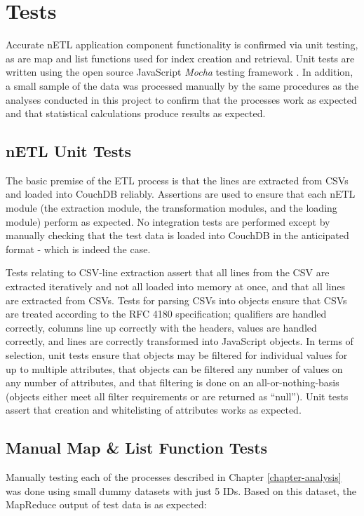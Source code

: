 \section{Tests}
Accurate nETL application component functionality is confirmed via unit testing, as are map and list functions used for index creation and retrieval. Unit tests are written using the open source JavaScript \textit{Mocha} testing framework \cite{mochaTest}. In addition, a small sample of the data was processed manually by the same procedures as the analyses conducted in this project to confirm that the processes work as expected and that statistical calculations produce results as expected.

\subsection{nETL Unit Tests}
The basic premise of the ETL process is that the lines are extracted from CSVs and loaded into CouchDB reliably. Assertions are used to ensure that each nETL module (the extraction module, the transformation modules, and the loading module) perform as expected. No integration tests are performed except by manually checking that the test data is loaded into CouchDB in the anticipated format - which is indeed the case.

Tests relating to CSV-line extraction assert that all lines from the CSV are extracted iteratively and not all loaded into memory at once, and that all lines are extracted from CSVs. Tests for parsing CSVs into objects ensure that CSVs are treated according to the RFC 4180 specification; qualifiers are handled correctly, columns line up correctly with the headers, values are handled correctly, and lines are correctly transformed into JavaScript objects. In terms of selection, unit tests ensure that objects may be filtered for individual values for up to multiple attributes, that objects can be filtered any number of values on any number of attributes, and that filtering is done on an all-or-nothing-basis (objects either meet all filter requirements or are returned as ``null''). Unit tests assert that creation and whitelisting of attributes works as expected.

\subsection{Manual Map \& List Function Tests}
Manually testing each of the processes described in Chapter \ref{chapter-analysis} was done using small dummy datasets with just 5 IDs. Based on this dataset, the MapReduce output of test data is as expected:

